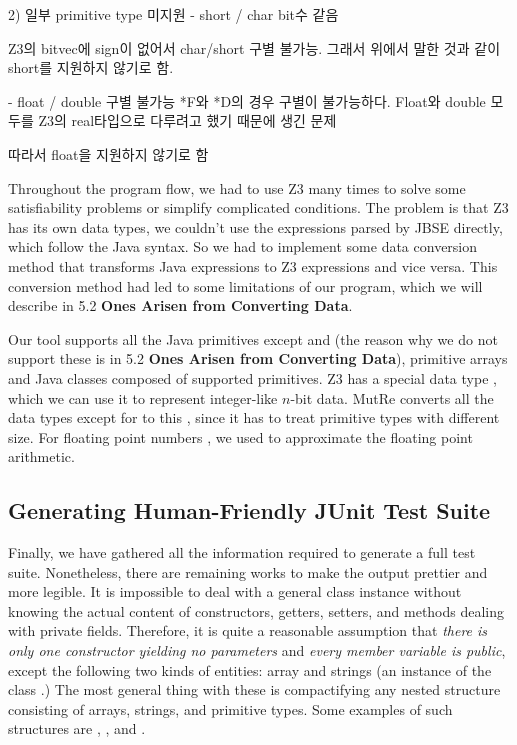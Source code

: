 \documentclass{article}
\begin{document}
2) 일부 primitive type 미지원
- short / char bit수 같음

Z3의 bitvec에 sign이 없어서 char/short 구별 불가능. 그래서 위에서 말한 것과 같이 short를 지원하지 않기로 함.

- float / double 구별 불가능
*F와 *D의 경우 구별이 불가능하다.
Float와 double 모두를 Z3의 real타입으로 다루려고 했기 때문에 생긴 문제

따라서 float을 지원하지 않기로 함



\fi

Throughout the program flow, we had to use Z3 many times to solve some satisfiability problems or simplify complicated conditions. The problem is that Z3 has its own data types, we couldn't use the expressions parsed by JBSE directly, which follow the Java syntax. So we had to implement some data conversion method that transforms Java expressions to Z3 expressions and vice versa. This conversion method had led to some limitations of our program, which we will describe in \textsf{\small 5.2 \bfseries Ones Arisen from Converting Data}.

Our tool supports all the Java primitives except  and  (the reason why we do not support these is in \textsf{\small 5.2 \bfseries Ones Arisen from Converting Data}), primitive arrays and Java classes composed of supported primitives.
Z3 has a special data type , which we can use it to represent integer-like $n$-bit data. MutRe converts all the data types except for  to this , since it has to treat primitive types with different size. For floating point numbers , we used  to approximate the floating point arithmetic.





\subsection{Generating Human-Friendly JUnit Test Suite}
\iffalse
1. array나 string, class instances에 대해 Z3 model output을 compact form으로 바꾸는 과정 서술

2. Junit test case로 출력하게 햇다는 거 간단히 서술
\fi

Finally, we have gathered all the information required to generate a full test suite. Nonetheless, there are remaining works to make the output prettier and more legible. It is impossible to deal with a general class instance without knowing the actual content of constructors, getters, setters, and methods dealing with private fields. Therefore, it is quite a reasonable assumption that \emph{there is only one constructor yielding no parameters} and \emph{every member variable is public}, except the following two kinds of entities: array and strings (an instance of the class .) The most general thing with these is compactifying any nested structure consisting of arrays, strings, and primitive types. Some examples of such structures are , , and .
\end{document}
